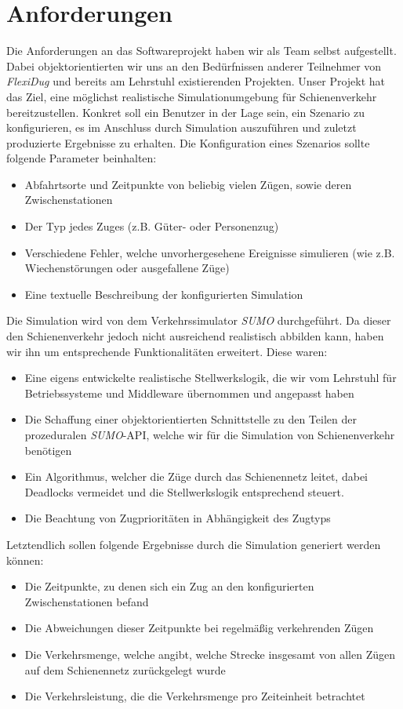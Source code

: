 \section{Anforderungen}
Die Anforderungen an das Softwareprojekt haben wir als Team selbst aufgestellt. Dabei objektorientierten wir uns an den Bedürfnissen anderer Teilnehmer von \emph{FlexiDug} und bereits am Lehrstuhl existierenden Projekten. Unser Projekt hat das Ziel, eine möglichst realistische Simulationumgebung für Schienenverkehr bereitzustellen. Konkret soll ein Benutzer in der Lage sein, ein Szenario zu konfigurieren, es im Anschluss durch Simulation auszuführen und zuletzt produzierte Ergebnisse zu erhalten. Die Konfiguration eines Szenarios sollte folgende Parameter beinhalten:
\begin{itemize}
    \item Abfahrtsorte und Zeitpunkte von beliebig vielen Zügen, sowie deren Zwischenstationen
    \item Der Typ jedes Zuges (z.B. Güter- oder Personenzug)
    \item Verschiedene Fehler, welche unvorhergesehene Ereignisse simulieren (wie z.B. Wiechenstörungen oder ausgefallene Züge)
    \item Eine textuelle Beschreibung der konfigurierten Simulation
\end{itemize}
Die Simulation wird von dem Verkehrssimulator \emph{SUMO} \cite{noauthor_eclipse_nodate} durchgeführt. Da dieser den Schienenverkehr jedoch nicht ausreichend realistisch abbilden kann, haben wir ihn um entsprechende Funktionalitäten erweitert. Diese waren:
\begin{itemize}
    \item Eine eigens entwickelte realistische Stellwerkslogik, die wir vom Lehrstuhl für Betriebssysteme und Middleware übernommen und angepasst haben \cite{noauthor_interlocking_2023}
    \item Die Schaffung einer objektorientierten Schnittstelle zu den Teilen der prozeduralen \emph{SUMO}-API, welche wir für die Simulation von Schienenverkehr benötigen
    \item Ein Algorithmus, welcher die Züge durch das Schienennetz leitet, dabei Deadlocks vermeidet und die Stellwerkslogik entsprechend steuert.
    \item Die Beachtung von Zugprioritäten in Abhängigkeit des Zugtyps
\end{itemize}
Letztendlich sollen folgende Ergebnisse durch die Simulation generiert werden können:
\begin{itemize}
    \item Die Zeitpunkte, zu denen sich ein Zug an den konfigurierten Zwischenstationen befand
    \item Die Abweichungen dieser Zeitpunkte bei regelmäßig verkehrenden Zügen
    \item Die Verkehrsmenge, welche angibt, welche Strecke insgesamt von allen Zügen auf dem Schienennetz zurückgelegt wurde
    \item Die Verkehrsleistung, die die Verkehrsmenge pro Zeiteinheit betrachtet
\end{itemize}

